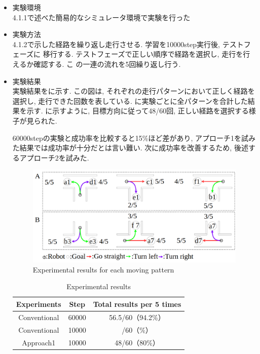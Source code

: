 \begin{itemize}
  \item 実験環境\\
  4.1.1で述べた簡易的なシミュレータ環境で実験を行った
  \item 実験方法\\
  4.1.2で示した経路を繰り返し走行させる. 学習を10000step実行後, テストフェーズに
  移行する. テストフェーズで正しい順序で経路を選択し, 走行を行えるか確認する. こ
  の一連の流れを5回繰り返し行う.
  \newpage
  \item 実験結果\\
  実験結果をに示す. この図は, それぞれの走行パターンにおいて正しく経路を選択し, 走行できた回数を表している. に実験ごとに全パターンを合計した結果を示す. 
  に示すように, 目標方向に従って48/60回, 正しい経路を選択する様子が見られた. 
  \par
  60000stepの実験と成功率を比較すると15\%ほど差があり, アプローチ1を試みた結果では成功率が十分だとは言い難い. 次に成功率を改善するため, 後述するアプローチ2を試みた.

  \vspace{0.5cm}

  \begin{figure}[hbtp]
    \centering
   \includegraphics[keepaspectratio, scale=0.3]
        {images/10000step_act1.0.png}
   \caption{Experimental results for each moving pattern}
   \label{Fig:10000step_act1.0}
  \end{figure}  
  
  \vspace{0.5cm}

  \begin{table}[hbtp]
    \caption{Experimental results}
    \label{table:result3}
    \centering
    \begin{tabular}{|c|c|c|}
      \hline
      Experiments & Step & Total results per 5 times\\
      \hline
      Conventional & 60000 & 56.5/60（94.2\%）\\
      \hline
      Conventional & 10000 & /60（\%）\\
      \hline
      Approach1 & 10000 & 48/60（80\%）\\
      \hline
    \end{tabular}
  \end{table}

\end{itemize}

